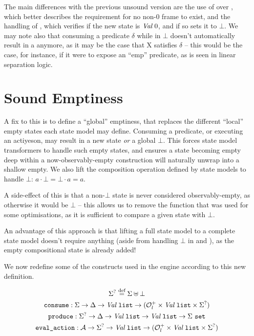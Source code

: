 The main differences with the previous unsound version are the use of \isexowned over , which better describes the requirement for no non-0 frame to exist, and the handling of , which verifies if the new state is $\textit{Val}~0$, and if so sets it to $\bot$. We may note also that consuming a predicate $\delta$ while in $\bot$ doesn't automatically result in a \Miss anymore, as it may be the case that X satisfies $\delta$ -- this would be the case, for instance, if it were to expose an ``emp'' predicate, as is seen in linear separation logic.

\section{Sound Emptiness}

A fix to this is to define a ``global'' emptiness, that replaces the different ``local'' empty states each state model may define. Consuming a predicate, or executing an actiyeson, may result in a new state {\it or} a global $\bot$. This forces state model transformers to handle such empty states, and ensures a state becoming empty deep within a now-observably-empty construction will naturally unwrap into a shallow empty. We also lift the composition operation defined by state models to handle $\bot$: $a \cdot \bot = \bot \cdot a = a$.

A side-effect of this is that a non-$\bot$ state is never considered observably-empty, as otherwise it would be $\bot$ -- this allows us to remove the  function that was used for some optimisations, as it is sufficient to compare a given state with $\bot$.

An advantage of this approach is that lifting a full state model to a complete state model doesn't require anything (aside from handling $\bot$ in  and ), as the empty compositional state is already added!

We now redefine some of the constructs used in the engine according to this new definition.
{
\newcommand{\vallist}[0]{\textit{Val}~\code{list}}


\begin{gather*}
	\St^? \defeq \St \uplus \bot\\
	\code{consume}:\St \rarr \Delta \rarr \vallist \rarr (\mathcal O^+_l \times \vallist \times \St^?) \\
	\code{produce}:\St^? \rarr \Delta \rarr \vallist \rarr \vallist \rarr \St~\code{set}\\
	\code{eval\_action}: {\cal A} \rarr \St^? \rarr \vallist \rarr (\mathcal O^+_l \times \vallist \times \St^?)
\end{gather*}}

